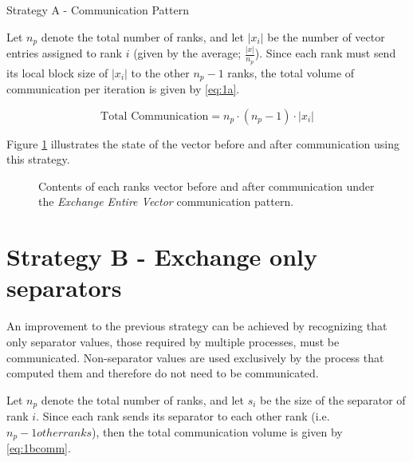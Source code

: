 \begin{algorithm}[H]
    \label{alg:1acomm}
    \caption{Strategy A - Communication Pattern}
    \SetAlgoVlined
\end{algorithm}
\medskip

Let \(n_{p}\) denote the total number of ranks, and let \(\left| x_{i} \right|\) be the number of vector entries assigned to rank \(i\) (given by the average; \(\frac{\left| x \right|}{n_{p}}\)). Since each rank must send its local block size of \(\left| x_{i} \right|\) to the other \(n_{p}-1\) ranks, the total volume of communication per iteration is given by \ref{eq:1a}.


\begin{equation}
    \label{eq:1a}
    \text{Total Communication} = n_{p} \cdot  (n_{p}-1) \cdot \left| x_{i} \right|
\end{equation}

Figure \ref{fig:1acomm} illustrates the state of the vector before and after communication using this strategy.

\begin{figure}[H]
    \centering
    \caption{Contents of each ranks vector before and after communication under the \textit{Exchange Entire Vector} communication pattern.}
    \label{fig:1acomm}
\end{figure}

\section{Strategy B - Exchange only separators}
An improvement to the previous strategy can be achieved by recognizing that only separator values, those required by multiple processes, must be communicated. Non-separator values are used exclusively by the process that computed them and therefore do not need to be communicated. 
\medskip

Let \(n_{p}\) denote the total number of ranks, and let \(s_{i}\) be the size of the separator of rank \(i\). Since each rank sends its separator to each other rank (i.e. \(n_{p} - 1 other ranks\)), then the total communication volume is given by \ref{eq:1bcomm}.

